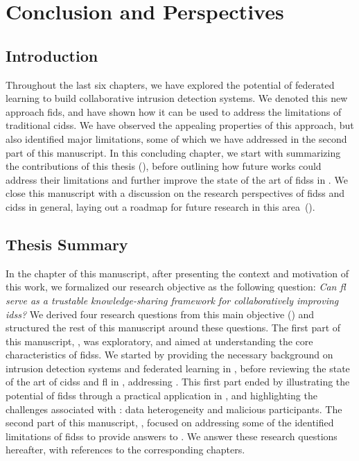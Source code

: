\chapter{Conclusion and Perspectives\label{chap:conclusion}}

\section{Introduction\label{sec:conclusion.introduction}}

Throughout the last six chapters, we have explored the potential of federated learning to build collaborative intrusion detection systems.
We denoted this new approach \gls{fids}, and have shown how it can be used to address the limitations of traditional \glspl{cids}.
We have observed the appealing properties of this approach, but also identified major limitations, some of which we have addressed in the second part of this manuscript.
In this concluding chapter, we start with summarizing the contributions of this thesis (), before outlining how future works could address their limitations and further improve the state of the art of \glspl{fids} in .
We close this manuscript with a discussion on the research perspectives of \glspl{fids} and \glspl{cids} in general, laying out a roadmap for future research in this area~().


\section{Thesis Summary\label{sec:conclusion.contribs}}

In the  chapter of this manuscript, after presenting the context and motivation of this work, we formalized our research objective as the following question: \emph{Can \gls{fl} serve as a trustable knowledge-sharing framework for collaboratively improving \glspl{ids}?}
We derived four research questions from this main objective () and structured the rest of this manuscript around these questions.
The first part of this manuscript, , was exploratory, and aimed at understanding the core characteristics of \glspl{fids}.
We started by providing the necessary background on intrusion detection systems and federated learning in , before reviewing the state of the art of \glspl{cids} and \gls{fl} in , addressing .
This first part ended by illustrating the potential of \glspl{fids} through a practical application in , and highlighting the challenges associated with : data heterogeneity and malicious participants.
The second part of this manuscript, , focused on addressing some of the identified limitations of \glspl{fids} to provide answers to .
We answer these research questions hereafter, with references to the corresponding chapters.

